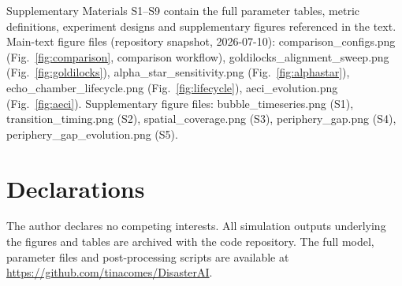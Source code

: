 \documentclass[pdflatex,sn-basic]{sn-jnl}
\begin{document}
\backmatter

Supplementary Materials S1--S9 contain the full parameter tables, metric definitions, experiment designs and supplementary figures referenced in the text. Main-text figure files (repository snapshot, 2026-07-10): comparison\_configs.png (Fig.~\ref{fig:comparison}, comparison workflow), goldilocks\_alignment\_sweep.png (Fig.~\ref{fig:goldilocks}), alpha\_star\_sensitivity.png (Fig.~\ref{fig:alphastar}), echo\_chamber\_lifecycle.png (Fig.~\ref{fig:lifecycle}), aeci\_evolution.png (Fig.~\ref{fig:aeci}). Supplementary figure files: bubble\_timeseries.png (S1), transition\_timing.png (S2), spatial\_coverage.png (S3), periphery\_gap.png (S4), periphery\_gap\_evolution.png (S5).


\section*{Declarations}

 The author declares no competing interests.
 All simulation outputs underlying the figures and tables are archived with the code repository.
 The full model, parameter files and post-processing scripts are available at \url{https://github.com/tinacomes/DisasterAI}.


\end{document}
